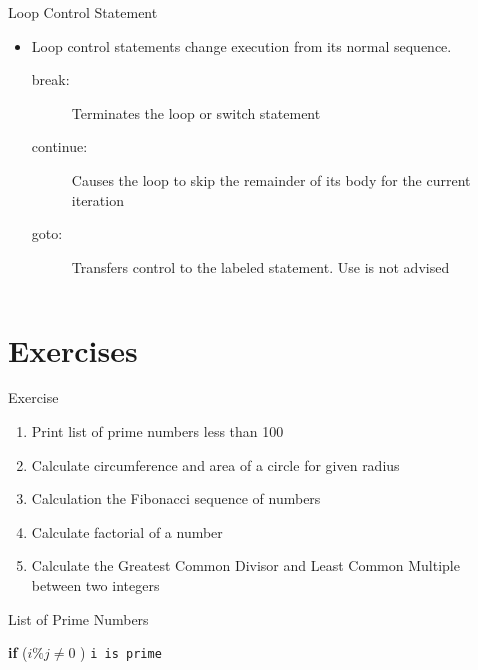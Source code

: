\documentclass[10pt,t]{beamer}
\begin{document}
\begin{frame}[fragile]
  
\end{frame}

\begin{frame}[fragile]{Loop Control Statement}
  \begin{itemize}
    \item Loop control statements change execution from its normal sequence.
      \begin{description}
        \item[break:] Terminates the loop or switch statement
        \item[continue:] Causes the loop to skip the remainder of its body for the current iteration
        \item[goto:] Transfers control to the labeled statement. Use is not advised
      \end{description}
  \end{itemize}
  \begin{columns}
    
    
  \end{columns}
\end{frame}

\section{Exercises}
\begin{frame}{Exercise}
  \begin{enumerate}
    \item Print list of prime numbers less than 100
    \item Calculate circumference and area of a circle for given radius
    \item Calculation the Fibonacci sequence of numbers
    \item Calculate factorial of a number
    \item Calculate the Greatest Common Divisor and Least Common Multiple between two integers
  \end{enumerate}
\end{frame}

\begin{frame}{List of Prime Numbers}
  \begin{algorithm}[H]
    \caption{Pseudo code to get list of prime numbers}
    \begin{algorithmic}
        \State \textbf{if} ($i\%j \ne 0$ ) \texttt{i is prime}
        \EndFor
      \EndFor
    \end{algorithmic}
  \end{algorithm}
\end{frame}
\end{document}

